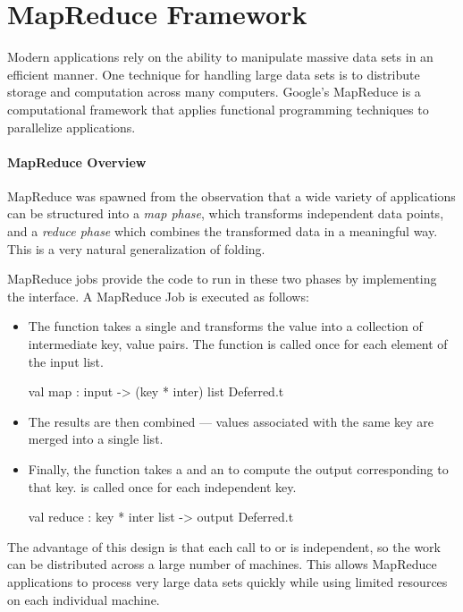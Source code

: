 \documentclass{pset}
\begin{document}
\part{MapReduce Framework}

Modern applications rely on the ability to manipulate massive data sets in an
efficient manner.  One technique for handling large data sets is to distribute
storage and computation across many computers.  Google's MapReduce is a
computational framework that applies functional programming techniques to
parallelize applications.

\subsection*{MapReduce Overview}

MapReduce was spawned from the observation that a wide variety of applications
can be structured into a \emph{map phase}, which transforms independent data
points, and a \emph{reduce phase} which combines the transformed data in a
meaningful way.  This is a very natural generalization of folding.

MapReduce jobs provide the code to run in these two phases by implementing the
 interface.  A MapReduce Job is executed as follows:
\begin{itemize}
\item The  function takes a single  and transforms the
      value into a collection of intermediate key, value pairs.  The 
      function is called once for each element of the input list.
      \begin{ocaml}
      val map : input -> (key * inter) list Deferred.t
      \end{ocaml}

\item The  results are then combined --- values associated with the
      same key are merged into a single list.

\item Finally, the  function takes a  and an 
      to compute the output corresponding to that key.
       is called once for each independent key.
      \begin{ocaml}
      val reduce : key * inter list -> output Deferred.t
      \end{ocaml}
\end{itemize}

The advantage of this design is that each call to  or 
is independent, so the work can be distributed across a large number of
machines.  This allows MapReduce applications to process very large data sets
quickly while using limited resources on each individual machine.
\end{document}
